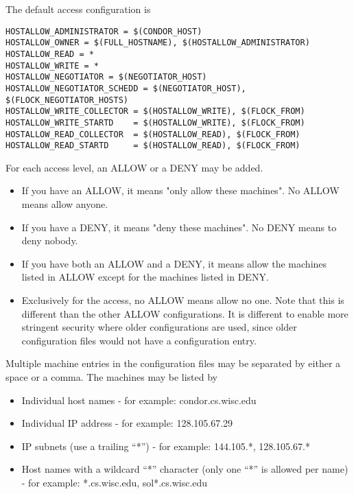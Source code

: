 The default access configuration is
\footnotesize
\begin{verbatim}
HOSTALLOW_ADMINISTRATOR = $(CONDOR_HOST)
HOSTALLOW_OWNER = $(FULL_HOSTNAME), $(HOSTALLOW_ADMINISTRATOR)
HOSTALLOW_READ = *
HOSTALLOW_WRITE = *
HOSTALLOW_NEGOTIATOR = $(NEGOTIATOR_HOST)
HOSTALLOW_NEGOTIATOR_SCHEDD = $(NEGOTIATOR_HOST), $(FLOCK_NEGOTIATOR_HOSTS)
HOSTALLOW_WRITE_COLLECTOR = $(HOSTALLOW_WRITE), $(FLOCK_FROM)
HOSTALLOW_WRITE_STARTD    = $(HOSTALLOW_WRITE), $(FLOCK_FROM)
HOSTALLOW_READ_COLLECTOR  = $(HOSTALLOW_READ), $(FLOCK_FROM)
HOSTALLOW_READ_STARTD     = $(HOSTALLOW_READ), $(FLOCK_FROM)
\end{verbatim}
\normalsize

For each access level, an ALLOW or a DENY may be added.
\begin{itemize}

\item If you have an ALLOW, it means "only allow these machines".  No
    ALLOW means allow anyone.

\item If you have a DENY, it means "deny these machines".  No DENY
    means to deny nobody.

\item If you have both an ALLOW and a DENY, it means allow the
    machines listed in ALLOW except for the machines listed in DENY.

\item Exclusively for the  access,
    no ALLOW means allow no one.
    Note that this is different than the other ALLOW configurations.
    It is different to enable more stringent security where
    older configurations are used, since
    older configuration files would not have a 
     configuration entry.
\end{itemize}

Multiple machine entries
in the configuration files
may be separated by either a space or a comma.
The machines may be listed by

\begin{itemize}
\item Individual host names - for example: condor.cs.wisc.edu
\item Individual IP address - for example: 128.105.67.29
\item IP subnets (use a trailing ``*'') - for example: 144.105.*, 128.105.67.*
\item Host names with a wildcard ``*'' character (only one ``*'' is
    allowed per name) - for example: *.cs.wisc.edu, sol*.cs.wisc.edu
\end{itemize}

